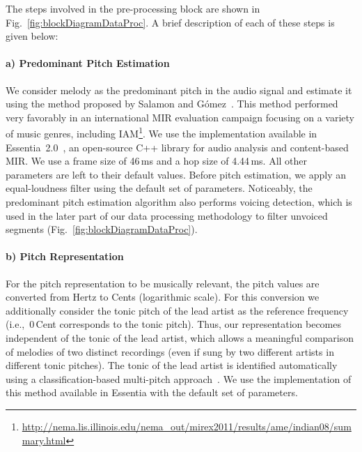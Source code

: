 

The steps involved in the pre-processing block are shown in Fig.~\ref{fig:blockDiagramDataProc}. A brief description of each of these steps is given below:

\paragraph{a) Predominant Pitch Estimation} We consider melody as the predominant pitch in the audio signal and estimate it using the method proposed by Salamon and G\'omez~\cite{Salamon2012}. This method performed very favorably in an international MIR evaluation campaign focusing on a variety of music genres, including IAM\footnote{\url{http://nema.lis.illinois.edu/nema_out/mirex2011/results/ame/indian08/summary.html}}. We use the implementation available in Essentia~2.0~\cite{essentia}, an open-source C++ library for audio analysis and content-based MIR. We use a frame size of 46\,ms and a hop size of 4.44\,ms. All other parameters are left to their default values. Before pitch estimation, we apply an equal-loudness filter using the default set of parameters. Noticeably, the predominant pitch estimation algorithm also performs voicing detection, which is used in the later part of our data processing methodology to filter unvoiced segments (Fig.~\ref{fig:blockDiagramDataProc}).%



\paragraph{b) Pitch Representation} For the pitch representation to be musically relevant, the pitch values are converted from Hertz to Cents (logarithmic scale). For this conversion we additionally consider the tonic pitch of the lead artist as the reference frequency (i.e.,~0\,Cent corresponds to the tonic pitch). Thus, our representation becomes independent of the tonic of the lead artist, which allows a meaningful comparison of melodies of two distinct recordings (even if sung by two different artists in different tonic pitches). The tonic of the lead artist is identified automatically using a classification-based multi-pitch approach~\cite{Gulati2014Tonic}. We use the implementation of this method available in Essentia with the default set of parameters.%



